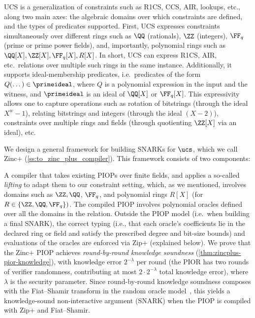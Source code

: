 UCS is a generalization of constraints such as R1CS, CCS, AIR, lookups, etc., along two main axes: the algebraic domains over which constraints are defined, and the types of predicates supported. First, UCS expresses constraints simultaneously over different rings such as $\QQ$ (rationals), $\ZZ$ (integers), $\FF_q$ (prime or prime power fields), and, importantly, polynomial rings such as $\QQ[X], \ZZ[X], \FF_q[X], R[X]$. In short, UCS can express R1CS, AIR, etc.\ relations over multiple such rings in the same instance. Additionally, it supports ideal-membership predicates, i.e.\ predicates of the form  $Q(\dots)\in \primeideal$, where $Q$ is a polynomial expression in the input and the witness, and $\primeideal$ is an ideal of $\QQ[X]$ or $\FF_q[X]$. This expressivity allows one to capture operations such as rotation of bitstrings (through the ideal $X^w-1$), relating bitstrings and integers (through the ideal $(X-2)$), constraints over multiple rings and fields (through quotienting $\ZZ[X]$ via an ideal), etc.

We design a general framework for building SNARKs for $\ucs$, which we call Zinc+ (\cref{ss:to_zinc_plus_compiler}). This framework consists of two components: 



 A compiler that takes existing PIOPs over finite fields, and applies a so-called \emph{lifting} to adapt them to our constraint setting, which, as we mentioned, involves domains such as $\ZZ, \QQ$, $\FF_q$, and polynomial rings $R[X]$ (for $R\in \{\ZZ, \QQ, \FF_q\})$. %
%
The compiled PIOP involves polynomial oracles defined over all the domains in the relation. Outside the PIOP model (i.e.\ when building a final SNARK), the correct typing (i.e., that each oracle's coefficients lie in the declared ring or field and satisfy the prescribed degree and bit-size bounds) and evaluations of the oracles are enforced via Zip$+$ (explained below). We prove that the Zinc$+$ PIOP achieves \emph{round-by-round knowledge soundness} (\cref{thm:zincplus-pior-knowledge}), with knowledge error $2^{-\lambda}$ per round (the PIOR has two rounds of verifier randomness, contributing at most $2 \cdot 2^{-\lambda}$ total knowledge error), where $\lambda$ is the security parameter. Since round-by-round knowledge soundness composes with the Fiat--Shamir transform in the random oracle model~\cite{TCC:BenChiSpo16}, this yields a knowledge-sound non-interactive argument (SNARK) when the PIOP is compiled with Zip$+$ and Fiat--Shamir.

